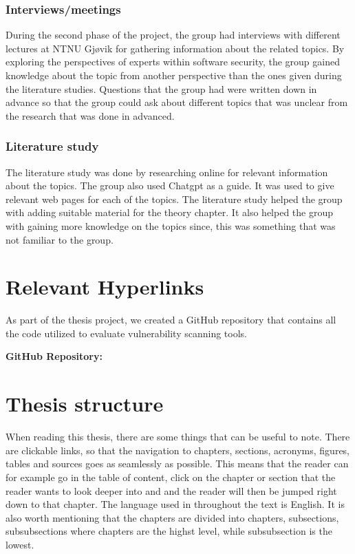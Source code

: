 \subsubsection{Interviews/meetings}
During the second phase of the project, the group had interviews with different lectures at NTNU Gjøvik for gathering information about the related topics. By exploring the perspectives of experts within software security, the group gained knowledge about the topic from another perspective than the ones given during the literature studies. Questions that the group had were written down in advance so that the group could ask about different topics that was unclear from the research that was done in advanced.   

\subsubsection{Literature study}
The literature study was done by researching online for relevant information about the topics. The group also used Chatgpt as a guide. It was used to give relevant web pages for each of the topics. The literature study helped the group with adding suitable material for the theory chapter. It also helped the group with gaining more knowledge on the topics since, this was something that was not familiar to the group. 

\section{Relevant Hyperlinks}
As part of the thesis project, we created a GitHub repository that contains all the code utilized to evaluate vulnerability scanning tools.

\textbf{GitHub Repository:} \href{}{}


\section{Thesis structure}
When reading this thesis, there are some things that can be useful to note. There are clickable links, so that the navigation to chapters, sections, acronyms, figures, tables and sources goes as seamlessly as possible. This means that the reader can for example go in the table of content, click on the chapter or section that the reader wants to look deeper into and and the reader will then be jumped right down to that chapter. The language used in throughout the text is English. It is also worth mentioning that the chapters are divided into chapters, subsections, subsubsections where chapters are the highst level, while subsubsection is the lowest. 
